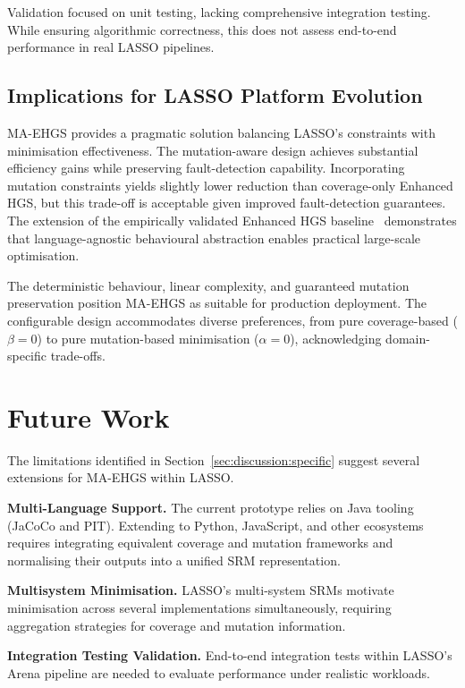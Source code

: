 Validation focused on unit testing, lacking comprehensive integration testing. While ensuring algorithmic correctness, this does not assess end-to-end performance in real LASSO pipelines.

\subsection{Implications for LASSO Platform Evolution}

MA-EHGS provides a pragmatic solution balancing LASSO's constraints with minimisation effectiveness. The mutation-aware design achieves substantial efficiency gains while preserving fault-detection capability. Incorporating mutation constraints yields slightly lower reduction than coverage-only Enhanced HGS, but this trade-off is acceptable given improved fault-detection guarantees. The extension of the empirically validated Enhanced HGS baseline~\cite{gladston2015} demonstrates that language-agnostic behavioural abstraction enables practical large-scale optimisation.

The deterministic behaviour, linear complexity, and guaranteed mutation preservation position MA-EHGS as suitable for production deployment. The configurable design accommodates diverse preferences, from pure coverage-based ($\beta = 0$) to pure mutation-based minimisation ($\alpha = 0$), acknowledging domain-specific trade-offs.

\section{Future Work}
\label{sec:discussion:future}

The limitations identified in Section~\ref{sec:discussion:specific} suggest several extensions for MA-EHGS within LASSO.

\textbf{Multi-Language Support.} The current prototype relies on Java tooling (JaCoCo and PIT). Extending to Python, JavaScript, and other ecosystems requires integrating equivalent coverage and mutation frameworks and normalising their outputs into a unified SRM representation.

\textbf{Multisystem Minimisation.} LASSO's multi-system SRMs motivate minimisation across several implementations simultaneously, requiring aggregation strategies for coverage and mutation information.

\textbf{Integration Testing Validation.} End-to-end integration tests within LASSO's Arena pipeline are needed to evaluate performance under realistic workloads.

